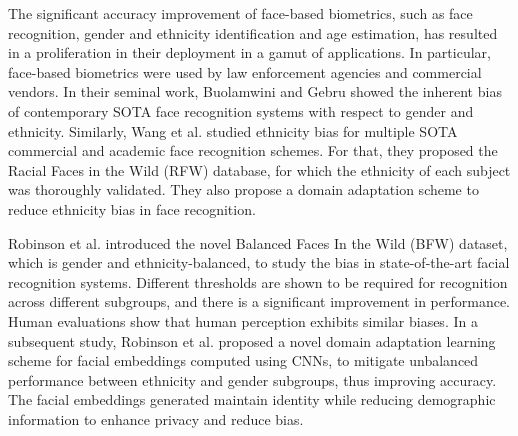 \documentclass[10pt,journal]{IEEEtran}\usepackage{amsfonts}
\begin{document}
\label{subsec:Related bias}

The significant accuracy improvement of face-based biometrics, such as face
recognition, gender and ethnicity identification and age estimation, has
resulted in a proliferation in their deployment in a gamut of applications. In
particular, face-based biometrics were used by law enforcement agencies
and commercial vendors. In their seminal work, Buolamwini and Gebru
\cite{Gebru} showed the inherent bias of contemporary SOTA face recognition
systems with respect to gender and ethnicity. Similarly, Wang et al.
\cite{9010843} studied ethnicity bias for multiple SOTA commercial and
academic face recognition schemes. For that, they proposed the Racial Faces in
the Wild (RFW) database, for which the ethnicity of each subject was
thoroughly validated. They also propose a domain adaptation scheme to reduce
ethnicity bias in face recognition.

Robinson et al. \cite{robinson2020face} introduced the novel Balanced Faces In
the Wild (BFW) dataset, which is gender and ethnicity-balanced, to study the
bias in state-of-the-art facial recognition systems. Different thresholds are
shown to be required for recognition across different subgroups, and there is
a significant improvement in performance. Human evaluations show that human
perception exhibits similar biases. In a subsequent study, Robinson et al.
\cite{robinson2021balancing} proposed a novel domain adaptation learning
scheme for facial embeddings computed using CNNs, to mitigate unbalanced performance between ethnicity and gender subgroups, thus improving
accuracy. The facial embeddings generated maintain identity while reducing
demographic information to enhance privacy and reduce bias.
\end{document}
